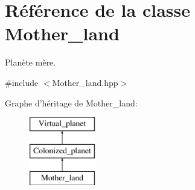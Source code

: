 \hypertarget{classMother__land}{\section{Référence de la classe Mother\-\_\-land}
\label{classMother__land}
}


Planète mère.  




{\ttfamily \#include $<$Mother\-\_\-land.\-hpp$>$}

Graphe d'héritage de Mother\-\_\-land\-:\begin{figure}[H]
\begin{center}
\leavevmode
\includegraphics[height=3.000000cm]{classMother__land}
\end{center}
\end{figure}
